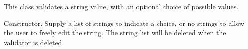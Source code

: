 \section{}\label{wxstringlistvalidator}


This class validates a string value, with an optional choice of possible values.



Constructor. Supply a list of strings to indicate a choice, or no strings to allow the
user to freely edit the string. The string list will be deleted when the validator is deleted.


